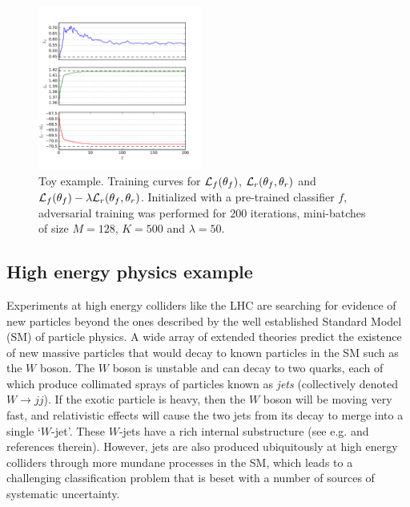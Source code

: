 \documentclass{article}
\theoremstyle{plain}
\begin{document}
\begin{figure}
    \includegraphics[width=0.48\textwidth]{../figures/training.pdf}
    \vspace{-1cm}
    \caption{Toy example. Training curves for ${\cal L}_f(\theta_f)$, ${\cal L}_r(\theta_f, \theta_r)$
             and ${\cal L}_f(\theta_f) - \lambda {\cal L}_r(\theta_f, \theta_r)$.
             Initialized with a pre-trained classifier $f$, adversarial training was performed for $200$ iterations, mini-batches of size $M=128$, $K=500$ and $\lambda=50$.}
    \label{fig:toy-training}
\end{figure}

\subsection{High energy physics example}
\label{sec:hep}

Experiments at high energy colliders like the LHC \citep{LHCMachine} are
searching for evidence of new particles beyond the ones described by the well
established Standard Model (SM) of particle physics. A wide array of extended
theories predict the existence of new massive particles that would decay to
known particles in the SM such as the $W$ boson. The $W$ boson is unstable and
can decay to two quarks, each of which produce collimated sprays of particles
known as \textit{jets} (collectively denoted $W\to jj$). If the exotic particle
is heavy, then the $W$ boson will be moving very fast, and  relativistic effects
will cause the two jets from its decay to merge into a single `$W$-jet'. These
$W$-jets have a rich internal substructure (see e.g.
\citep{Altheimer:2012mn,Altheimer:2013yza} and references therein). However,
jets are also produced ubiquitously at high energy colliders through more
mundane processes in the SM, which leads to a challenging classification problem
that is beset with a number of sources of systematic uncertainty.
\end{document}
